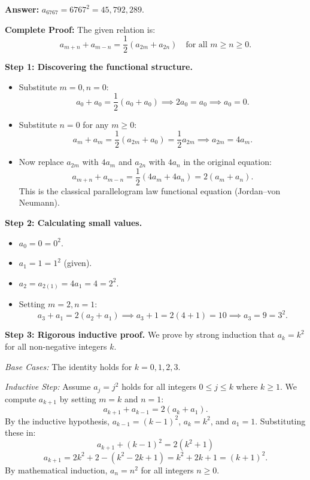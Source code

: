 \documentclass[12pt]{article}
\begin{document}
\textbf{Answer:} $a_{6767} = 6767^2 = 45{,}792{,}289$.

\textbf{Complete Proof:}
The given relation is:
\begin{equation*}
    a_{m+n} + a_{m-n} = \frac{1}{2}(a_{2m} + a_{2n}) \quad \text{for all } m \ge n \ge 0.
\end{equation*}

\textbf{Step 1: Discovering the functional structure.}
\begin{itemize}
    \item Substitute $m = 0, n = 0$:
    \[
    a_0 + a_0 = \frac{1}{2}(a_0 + a_0) \implies 2a_0 = a_0 \implies a_0 = 0.
    \]
    \item Substitute $n = 0$ for any $m \ge 0$:
    \[
    a_m + a_m = \frac{1}{2}(a_{2m} + a_0) = \frac{1}{2}a_{2m} \implies a_{2m} = 4a_m.
    \]
    \item Now replace $a_{2m}$ with $4a_m$ and $a_{2n}$ with $4a_n$ in the original equation:
    \[
    a_{m+n} + a_{m-n} = \frac{1}{2}(4a_m + 4a_n) = 2(a_m + a_n).
    \]
    This is the classical parallelogram law functional equation (Jordan--von Neumann).
\end{itemize}

\textbf{Step 2: Calculating small values.}
\begin{itemize}
    \item $a_0 = 0 = 0^2$.
    \item $a_1 = 1 = 1^2$ (given).
    \item $a_2 = a_{2(1)} = 4a_1 = 4 = 2^2$.
    \item Setting $m = 2, n = 1$:
    \[
    a_3 + a_1 = 2(a_2 + a_1) \implies a_3 + 1 = 2(4 + 1) = 10 \implies a_3 = 9 = 3^2.
    \]
\end{itemize}

\textbf{Step 3: Rigorous inductive proof.}
We prove by strong induction that $a_k = k^2$ for all non-negative integers $k$.

\textit{Base Cases:} The identity holds for $k = 0, 1, 2, 3$.

\textit{Inductive Step:} Assume $a_j = j^2$ holds for all integers $0 \le j \le k$ where $k \ge 1$. We compute $a_{k+1}$ by setting $m = k$ and $n = 1$:
\[
a_{k+1} + a_{k-1} = 2(a_k + a_1).
\]
By the inductive hypothesis, $a_{k-1} = (k-1)^2$, $a_k = k^2$, and $a_1 = 1$. Substituting these in:
\[
a_{k+1} + (k-1)^2 = 2(k^2 + 1)
\]
\[
a_{k+1} = 2k^2 + 2 - (k^2 - 2k + 1) = k^2 + 2k + 1 = (k+1)^2.
\]
By mathematical induction, $a_n = n^2$ for all integers $n \ge 0$.
\end{document}
